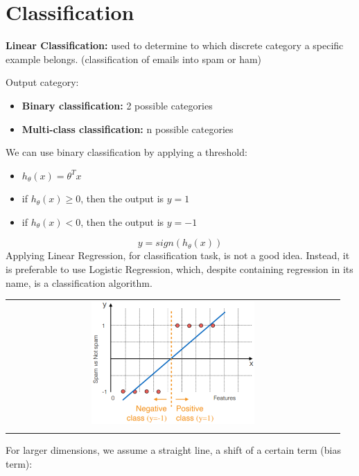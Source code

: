 \section{Classification}
\begin{mdframed}
    \textbf{Linear Classification:} used to determine to which discrete category a specific example belongs. (classification of emails into spam or ham)
\end{mdframed}
Output category:
\begin{itemize}
    \item \textbf{Binary classification:} 2 possible categories
    \item \textbf{Multi-class classification:} n possible categories
\end{itemize}
We can use binary classification by applying a threshold:
\begin{itemize}
    \item $h_\theta(x) = \theta^Tx$
    \item if $h_\theta(x) \geq 0$, then the output is $y = 1$
    \item if $h_\theta(x) < 0$, then the output is $y = -1$
\end{itemize}
\begin{equation} \tag{Classification}
    y = sign(h_\theta(x))
\end{equation}
Applying Linear Regression, for classification task, is not a good idea. Instead, it is preferable to use Logistic Regression, which, despite containing regression in its name, is a classification algorithm.
\begin{center}
    \begin{tabular}{c}
        \\ \includegraphics[width=0.5\textwidth]{images/Classification1.png} \\ \\
    \end{tabular}
\end{center}
For larger dimensions, we assume a straight line, a shift of a certain term (bias term):
